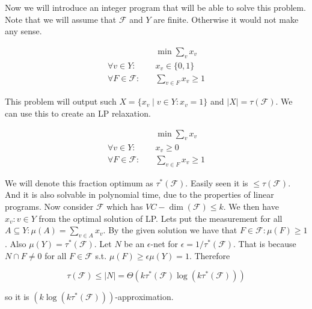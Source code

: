 Now we will introduce an integer program that will be able to solve this problem. Note that we will assume that $\mathcal{F}$ and $Y$ are finite. Otherwise it would not make any sense.

$$
\begin{aligned}
	&\min \sum_{v} x_{v} \\
	\forall v \in Y: \quad & x_{v} \in \{0,1\} \\
	\forall F \in \mathcal{F}: \quad & \sum_{v \in F} x_{v} \geq 1
\end{aligned}
$$

This problem will output such $X = \{x_{v} \mid v \in Y : x_{v} = 1\}$ and $|X| = \tau(\mathcal{F})$. We can use this to create an LP relaxation.

$$
\begin{aligned}
	&\min \sum_{v} x_{v} \\
	\forall v \in Y: \quad & x_{v} \geq 0 \\
	\forall F \in \mathcal{F}: \quad & \sum_{v \in F} x_{v} \geq 1
\end{aligned}
$$

We will denote this fraction optimum as $\tau^{\ast}(\mathcal{F})$. Easily seen it is $\leq \tau(\mathcal{F})$. And it is also solvable in polynomial time, due to the properties of linear programs. Now consider $\mathcal{F}$ which has $VC-\dim(\mathcal{F}) \leq k$. We then have $x_{v} : v \in Y$ from the optimal solution of LP. Lets put the measurement for all $A \subseteq Y: \mu(A) = \sum_{v \in A} x_{v}$. By the given solution we have that $F \in \mathcal{F}: \mu(F) \geq 1$. Also $\mu(Y) = \tau^{\ast}(\mathcal{F})$. Let $N$ be an $\epsilon$-net for $\epsilon = 1/\tau^{\ast}(\mathcal{F})$. That is because $N \cap F \neq 0$ for all $F \in \mathcal{F}$ s.t. $\mu(F) \geq \epsilon \mu(Y) = 1$. Therefore

$$
\tau(\mathcal{F}) \leq |N| = \Theta (k \tau^{\ast}(\mathcal{F}) \log(k \tau^{\ast}(\mathcal{F})))
$$

so it is $(k \log(k \tau^{\ast}(\mathcal{F})))$-approximation.
